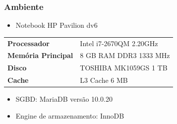 \documentclass[10pt]{beamer}
\begin{document}
\begin{frame}[fragile]
  \frametitle{Ambiente}

 \begin{itemize}
      \item Notebook HP Pavilion dv6 
    \end{itemize}

    \begin{table}[!htb]
    \footnotesize
    \centering
    \begin{tabular}{ll}
      \toprule
      \textbf{Processador} & Intel i7-2670QM 2.20GHz  \\
      \textbf{Memória Principal} & 8 GB RAM DDR3 1333 MHz \\
      \textbf{Disco} & TOSHIBA MK1059GS 1 TB \\
      \textbf{Cache} & L3 Cache 6 MB \\
      \bottomrule
    \end{tabular}
    \end{table}

  \begin{itemize}
    \item SGBD: MariaDB versão 10.0.20
    \item Engine de armazenamento: InnoDB 
  \end{itemize}
  
\end{frame}
\end{document}

